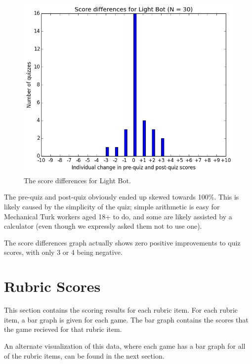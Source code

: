 			\begin{figure}[] 
			\centering 
			\includegraphics[width=\textwidth]{lightbot_results.png} 
			\caption{The score differences for Light Bot.}
			\end{figure}

			The pre-quiz and post-quiz obviously ended up skewed towards 100\%. This is likely caused by the simplicity of the quiz; simple arithmetic is easy for Mechanical Turk workers aged 18+ to do, and some are likely assisted by a calculator (even though we expressly asked them not to use one).

			The score differences graph actually shows zero positive improvements to quiz scores, with only 3 or 4 being negative.

			\clearpage

		\section{Rubric Scores}
			This section contains the scoring results for each rubric item. For each rubric item, a bar graph is given for each game. The bar graph contains the scores that the game recieved for that rubric item.

			An alternate visualization of this data, where each game has a bar graph for all of the rubric items, can be found in the next section.


